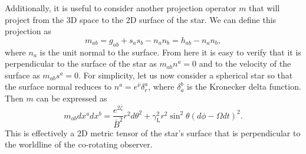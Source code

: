 \documentclass{aa}
\newcommand{\be}{\begin{equation}}
\newcommand{\ee}{\end{equation}}
\newcommand{\red}[1]{\textcolor{red}{#1}}
\newcommand{\refe}[1]{#1}
\newcommand{\refedel}[1]{}
\newcommand{\nub}{\ensuremath{\bar{\nu}}}
\newcommand{\zetab}{\ensuremath{\bar{\zeta}}}
\newcommand{\Bb}{\ensuremath{\bar{B}}}
\newcommand{\lgamma}{\gamma_{\text{L}}}
\begin{document}
\refe{Additionally, it is useful to consider another projection operator $m$ that will project from the 3D space to the 2D surface of the star.}
\refe{We can define this projection as}
\be\label{eq:2dmetric}
m_{ab} = g_{ab} + s_a s_b - n_a n_b = h_{ab} - n_a n_b,
\ee
\refe{where $n_a$ is the unit normal to the surface.}
\refe{From here it is easy to verify that it is perpendicular to the surface of the star as $m_{ab} n^a = 0$ and to the velocity of the surface as $m_{ab} s^a = 0$.}
\refe{For simplicity, let us now consider a spherical star so that the surface normal reduces to $n^a = e^{\nub} \delta_r^a$, where $\delta_a^b$ is the Kronecker delta function.}
\refe{Then $m$ can be expressed as}
\be
m_{ab} dx^a dx^b = \frac{e^{2\zetab}}{\Bb^2} r^2 d\theta^2 + \lgamma^2 r^2 \sin^2\theta (d\phi - \Omega dt)^2.
\ee
\refe{This is effectively a 2D metric tensor of the star's surface that is perpendicular to the worldline of the co-rotating observer.}
\end{document}
